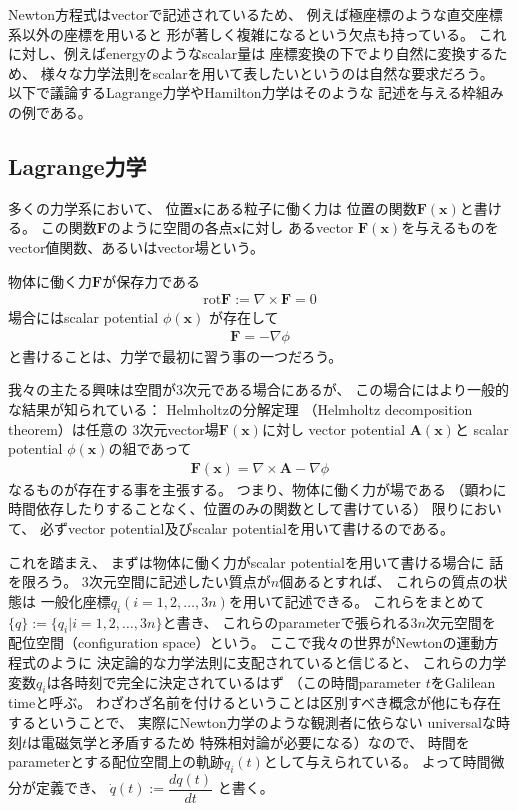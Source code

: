 Newton方程式はvectorで記述されているため、
例えば極座標のような直交座標系以外の座標を用いると
形が著しく複雑になるという欠点も持っている。
これに対し、例えばenergyのようなscalar量は
座標変換の下でより自然に変換するため、
様々な力学法則をscalarを用いて表したいというのは自然な要求だろう。
以下で議論するLagrange力学やHamilton力学はそのような
記述を与える枠組みの例である。

\subsection{Lagrange力学}

多くの力学系において、
位置$\bm{x}$にある粒子に働く力は
位置の関数$\bm{F}(\bm{x})$と書ける。
この関数$\bm{F}$のように空間の各点$\bm{x}$に対し
あるvector $\bm{F}(\bm{x})$を与えるものを
vector値関数、あるいはvector場という。

物体に働く力$\bm{F}$が保存力である
\begin{align}
  \mathrm{rot} \bm{F}
  :=
  \nabla \times \bm{F}
  = 0
\end{align}
場合にはscalar potential $\phi(\bm{x})$
が存在して
\begin{align}
  \bm{F} = -\nabla \phi
\end{align}
と書けることは、力学で最初に習う事の一つだろう。

我々の主たる興味は空間が3次元である場合にあるが、
この場合にはより一般的な結果が知られている：
Helmholtzの分解定理
（Helmholtz decomposition theorem）は任意の
3次元vector場$\bm{F}(\bm{x})$に対し
vector potential $\bm{A}(\bm{x})$と
scalar potential $\phi(\bm{x})$の組であって
\begin{align}
  \bm{F}(\bm{x}) = \nabla \times \bm{A} - \nabla \phi
\label{helmholtz decomposition theorem}
\end{align}
なるものが存在する事を主張する。
つまり、物体に働く力が場である
（顕わに時間依存したりすることなく、位置のみの関数として書けている）
限りにおいて、
必ずvector potential及びscalar potentialを用いて書けるのである。

これを踏まえ、
まずは物体に働く力がscalar potentialを用いて書ける場合に
話を限ろう。
3次元空間に記述したい質点が$n$個あるとすれば、
これらの質点の状態は
一般化座標$q_i$$(i=1,2,\dots,3n)$を用いて記述できる。
これらをまとめて$\{q\} := \{q_i| i=1,2,\dots,3n\}$と書き、
これらのparameterで張られる$3n$次元空間を
配位空間（configuration space）という。
ここで我々の世界がNewtonの運動方程式のように
決定論的な力学法則に支配されていると信じると、
これらの力学変数$q_i$は各時刻で完全に決定されているはず
（この時間parameter $t$をGalilean timeと呼ぶ。
わざわざ名前を付けるということは区別すべき概念が他にも存在するということで、
実際にNewton力学のような観測者に依らない
universalな時刻$t$は電磁気学と矛盾するため
特殊相対論が必要になる）なので、
時間をparameterとする配位空間上の軌跡$q_i(t)$として与えられている。
よって時間微分が定義でき、
$\dot{q}(t) := \dfrac{dq(t)}{dt}$
と書く。

